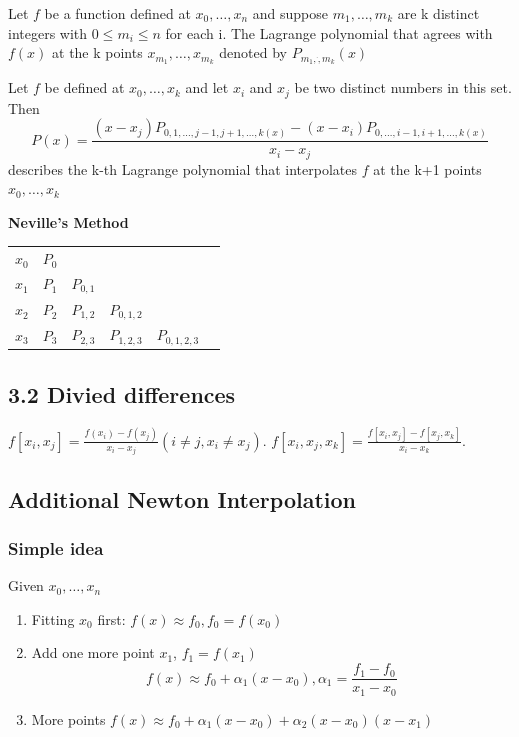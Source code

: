 \documentclass[11pt]{article}
\begin{document}
\begin{definition}
Let $f$ be a function defined at $x_0,\dots,x_n$ and suppose $m_1,\dots,m_k$ are
k distinct integers with $0\le m_i\le n$ for each i. The Lagrange polynomial that
agrees with $f(x)$ at the k points $x_{m_1},\dots,x_{m_k}$ denoted by 
$P_{m_1,\dot,m_k}(x)$
\end{definition}

\begin{theorem}
Let $f$ be defined at $x_0,\dots,x_k$ and let $x_i$ and $x_j$ be two distinct numbers in
this set. Then
\begin{equation*}
P(x)=\frac{(x-x_j)P_{0,1,\dots,j-1,j+1,\dots,k(x)}-(x-x_i)P_{0,\dots,i-1,i+1,\dots,k(x)}}
{x_i-x_j}
\end{equation*}
describes the k-th Lagrange polynomial that interpolates $f$ at the k+1 points
$x_0,\dots,x_k$
\end{theorem}

\textbf{Neville's Method}
\begin{tabular}{c c c c c c}
$x_0$ & $P_0$ &           &             &            \\
$x_1$ & $P_1$ & $P_{0,1}$ &             &            \\
$x_2$ & $P_2$ & $P_{1,2}$ & $P_{0,1,2}$ &            \\
$x_3$ & $P_3$ & $P_{2,3}$ & $P_{1,2,3}$ & $P_{0,1,2,3}$\\
\end{tabular}
\subsection{3.2 Divied differences}
\label{sec:orgcbd6ed8}
\(f[x_i,x_j]=\frac{f(x_i)-f(x_j)}{x_i-x_j}(i\neq j, x_i\neq x_j)\).
\(f[x_i,x_j,x_k]=\frac{f[x_i,x_j]-f[x_j,x_k]}{x_i-x_k}\).
\subsection{Additional Newton Interpolation}
\label{sec:org126be4a}
\subsubsection{Simple idea}
\label{sec:orgb78ea5f}
Given \(x_0,\dots,x_n\)
\begin{enumerate}
\item Fitting $x_0$ first: $f(x)\approx f_0, f_0=f(x_0)$
\item Add one more point $x_1$, $f_1=f(x_1)$
\begin{equation*}
f(x) \approx f_0+\alpha_1(x-x_0),\alpha_1=\frac{f_1-f_0}{x_1-x_0}
\end{equation*}
\item More points $f(x)\approx f_0+\alpha_1(x-x_0)+\alpha_2(x-x_0)(x-x_1)$
\end{enumerate}
\end{document}
